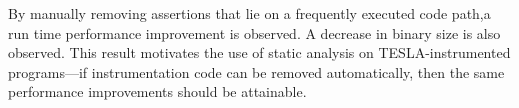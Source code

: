 By manually removing assertions that lie on a frequently executed code path,a run
time performance improvement is observed. A decrease in binary size is also
observed. This result motivates the use of static analysis on TESLA-instrumented
programs---if instrumentation code can be removed automatically, then the same
performance improvements should be attainable.







